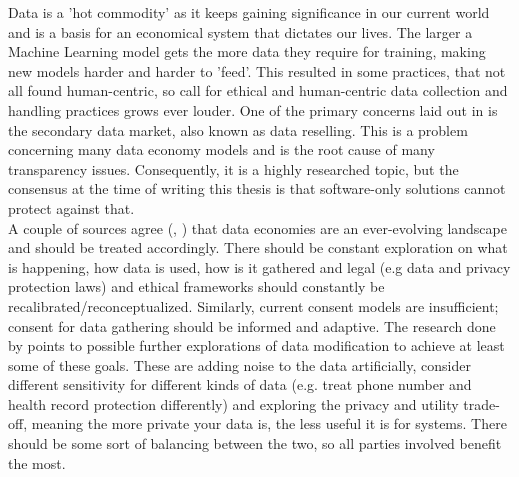 \documentclass[english, 12pt, a4paper, sci, utf8, a-2b, online]{aaltothesis}
\theoremstyle{change}
\theoremstyle{theoremstyle}
\begin{document}
Data is a 'hot commodity' as it keeps gaining significance in our current world and is a basis for an economical system that dictates our lives. The larger a Machine Learning model gets the more data they require for training, making new models harder and harder to 'feed'. This resulted in some practices, that not all found human-centric, so call for ethical and human-centric data collection and handling practices grows ever louder.
One of the primary concerns laid out in \cite{hyrynsalmi2023balancing} is the secondary data market, also known as data reselling. This is a problem concerning many data economy models and is the root cause of many transparency issues. Consequently, it is a highly researched topic, but the consensus at the time of writing this thesis is that software-only solutions cannot protect against that.\\

A couple of sources agree (\cite{valli2024ethical}, \cite{mirishli2025ethical}) that data economies are an ever-evolving landscape and should be treated accordingly. There should be constant exploration on what is happening, how data is used, how is it gathered and legal (e.g data and privacy protection laws) and ethical frameworks should constantly be recalibrated/reconceptualized. Similarly, current consent models are insufficient; consent for data gathering should be informed and adaptive. The research done by \cite{valli2024ethical} points to possible further explorations of data modification to achieve at least some of these goals. These are adding noise to the data artificially, consider different sensitivity for different kinds of data (e.g. treat phone number and health record protection differently) and exploring the privacy and utility trade-off, meaning the more private your data is, the less useful it is for systems. There should be some sort of balancing between the two, so all parties involved benefit the most.\\
\end{document}
